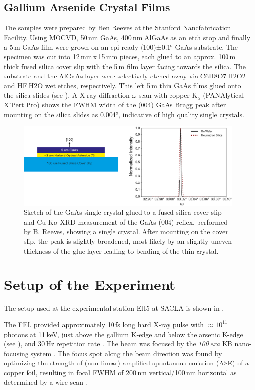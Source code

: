 \subsection{Gallium Arsenide Crystal Films}
The samples were prepared by Ben Reeves at the Stanford Nanofabrication Facility.
Using MOCVD, 50\,nm GaAs, 400\,nm AlGaAs as an etch stop and finally a 5\,\textmu m GaAs film were grown on an epi-ready (100)±0.1° GaAs substrate. The specimen was cut into 12\,mm\,x\,15\,mm pieces, each glued to an approx. 100\,\textmu m thick fused silica cover slip with the 5\,\textmu m film layer facing towards the silica. The substrate and the AlGaAs layer were selectively etched away via C6H8O7:H2O2 and HF:H2O wet etches, respectively. This left 5\,\textmu m thin GaAs films glued onto the silica slides (see ). 
A X-ray diffraction $\omega$-scan with copper K$_\alpha$ (PANAlytical X’Pert Pro) shows the FWHM width of the (004) GaAs Bragg peak after mounting on the silica slides as 0.004°, indicative of high quality single crystals. 



\begin{figure}
	\centering
	\includegraphics[width=0.8\linewidth]{images/gaas_sample.pdf}
	\caption[GaAs sample]{Sketch of the GaAs single crystal glued to a fused silica cover slip and Cu-K$\alpha$ XRD measurement of the GaAs (004) reflex, performed by B. Reeves, showing a single crystal. After mounting on the cover slip, the peak is slightly broadened, most likely by an slightly uneven thickness of the glue layer  leading to bending of the thin crystal.}
	\label{fig:gaas_sample}
\end{figure}

\FloatBarrier
\section{Setup of the Experiment}
The setup used at the experimental station EH5 at SACLA is shown in . 

The FEL provided approximately 10\,fs long hard X-ray pulse with $\approx 10^{11}$ photons at 11\,keV, just above the gallium K-edge and below the arsenic K-edge (see ), and 30\,Hz repetition rate \cite{tono2013}. The beam was focused by the \textit{100\,exa} KB nano-focusing system \cite{yumoto2020}. The focus spot along the beam direction was found by optimizing the strength of (non-linear) amplified spontanous emission (ASE) of a copper foil, resulting in focal FWHM of 200\,nm vertical/100\,nm horizontal as determined by a wire scan \cite{handa2010,yoneda2015}.

